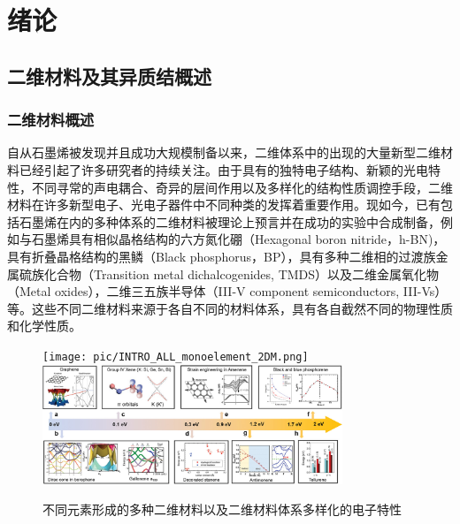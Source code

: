 \chapter{绪\hspace{12pt}论}

\section{二维材料及其异质结概述}
\subsection{二维材料概述}
    自从石墨烯被发现并且成功大规模制备以来，二维体系中的出现的大量新型二维材料已经引起了许多研究者的持续关注。由于具有的独特电子结构、新颖的光电特性，不同寻常的声电耦合、奇异的层间作用以及多样化的结构性质调控手段，二维材料在许多新型电子、光电子器件中不同种类的发挥着重要作用。现如今，已有包括石墨烯在内的多种体系的二维材料被理论上预言并在成功的实验中合成制备，例如与石墨烯具有相似晶格结构的六方氮化硼（Hexagonal boron nitride，h-BN)，具有折叠晶格结构的黑鳞（Black phosphorus，BP），具有多种二维相的过渡族金属硫族化合物（Transition metal dichalcogenides, TMDS）以及二维金属氧化物（Metal oxides），二维三五族半导体（III-V component semiconductors, III-Vs）等。这些不同二维材料来源于各自不同的材料体系，具有各自截然不同的物理性质和化学性质。

    \begin{figure}[htb]
        \texttt{[image: pic/INTRO\_ALL\_monoelement\_2DM.png]}
        \includegraphics[width=0.8\textwidth]{pic/INTRO_electronProperties_All2DM.jpg}
        \caption{\mbox{不同元素形成的多种二维材料以及二维材料体系多样化的电子特性}}
    \end{figure}

